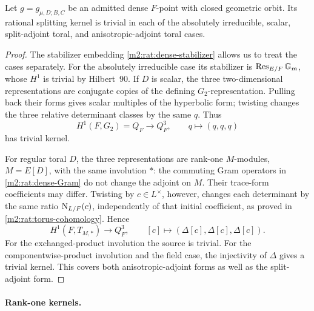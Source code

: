 \begin{proposition}\label{m2:rat:dense-kernel}
Let $g=g_{\mu,D;B,C}$ be an admitted dense $F$-point with
closed geometric orbit. Its rational splitting kernel is trivial
in each of the absolutely irreducible, scalar, split-adjoint
toral, and anisotropic-adjoint toral cases.
\end{proposition}

\begin{proof}
The stabilizer embedding \eqref{m2:rat:dense-stabilizer}
allows us to treat the cases separately. For the absolutely
irreducible case its stabilizer is
$\operatorname{Res}_{E/F}\mathbb G_m$, whose $H^1$ is trivial by Hilbert~90.
If $D$ is scalar, the three two-dimensional representations are
conjugate copies of the defining $G_2$-representation. Pulling
back their forms gives scalar multiples of the hyperbolic form;
twisting changes the three relative determinant classes by the
same $q$. Thus
\begin{equation}\label{m2:rat:dense-scalar-H1}
 H^1(F,G_2)=Q_F\longrightarrow Q_F^3,
 \qquad q\longmapsto(q,q,q)
\end{equation}
has trivial kernel.

For regular toral $D$, the three representations are rank-one
$M$-modules, $M=E[D]$, with the same involution $*$: the
commuting Gram operators in \eqref{m2:rat:dense-Gram} do not change
the adjoint on $M$. Their trace-form coefficients may differ.
Twisting by $c\in L^\times$, however, changes each determinant
by the same ratio $\operatorname{N}_{L/F}(c)$, independently of that initial
coefficient, as proved in \cref{m2:rat:torus-cohomology}. Hence
\begin{equation}\label{m2:rat:dense-toral-H1}
 H^1(F,T_{M,*})\longrightarrow Q_F^3,
 \qquad[c]\longmapsto(\Delta[c],\Delta[c],\Delta[c]).
\end{equation}
For the exchanged-product involution the source is trivial.
For the componentwise-product involution and the field case,
the injectivity of $\Delta$ gives a trivial kernel. This covers
both anisotropic-adjoint forms as well as the split-adjoint form.
\end{proof}

\paragraph{Rank-one kernels.}

